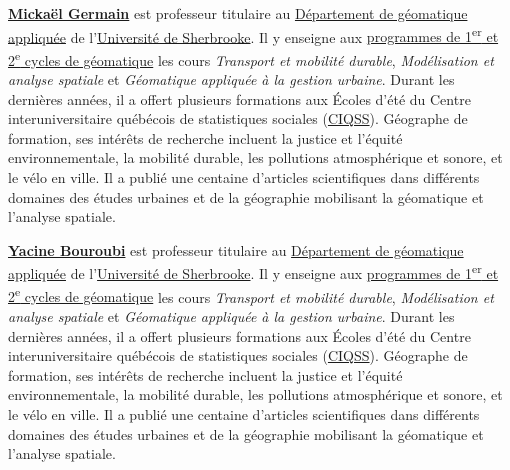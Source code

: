 \documentclass[
]{article}
\begin{document}
\href{https://www.usherbrooke.ca/geomatique/departement/personnel/personnel-enseignant/mickael-germain}{\textbf{Mickaël
Germain}} est professeur titulaire au
\href{https://www.usherbrooke.ca/geomatique/}{Département de géomatique
appliquée} de l'\href{https://www.usherbrooke.ca/}{Université de
Sherbrooke}. Il y enseigne aux
\href{https://www.usherbrooke.ca/geomatique/etudes/programmes}{programmes
de 1\textsuperscript{er} et 2\textsuperscript{e} cycles de géomatique}
les cours \emph{Transport et mobilité durable}, \emph{Modélisation et
analyse spatiale} et \emph{Géomatique appliquée à la gestion urbaine}.
Durant les dernières années, il a offert plusieurs formations aux Écoles
d'été du Centre interuniversitaire québécois de statistiques sociales
(\href{https://www.ciqss.org/}{CIQSS}). Géographe de formation, ses
intérêts de recherche incluent la justice et l'équité environnementale,
la mobilité durable, les pollutions atmosphérique et sonore, et le vélo
en ville. Il a publié une centaine d'articles scientifiques dans
différents domaines des études urbaines et de la géographie mobilisant
la géomatique et l'analyse spatiale.

\href{https://www.usherbrooke.ca/geomatique/departement/personnel/personnel-enseignant/yacine-bouroubi}{\textbf{Yacine
Bouroubi}} est professeur titulaire au
\href{https://www.usherbrooke.ca/geomatique/}{Département de géomatique
appliquée} de l'\href{https://www.usherbrooke.ca/}{Université de
Sherbrooke}. Il y enseigne aux
\href{https://www.usherbrooke.ca/geomatique/etudes/programmes}{programmes
de 1\textsuperscript{er} et 2\textsuperscript{e} cycles de géomatique}
les cours \emph{Transport et mobilité durable}, \emph{Modélisation et
analyse spatiale} et \emph{Géomatique appliquée à la gestion urbaine}.
Durant les dernières années, il a offert plusieurs formations aux Écoles
d'été du Centre interuniversitaire québécois de statistiques sociales
(\href{https://www.ciqss.org/}{CIQSS}). Géographe de formation, ses
intérêts de recherche incluent la justice et l'équité environnementale,
la mobilité durable, les pollutions atmosphérique et sonore, et le vélo
en ville. Il a publié une centaine d'articles scientifiques dans
différents domaines des études urbaines et de la géographie mobilisant
la géomatique et l'analyse spatiale.
\end{document}
